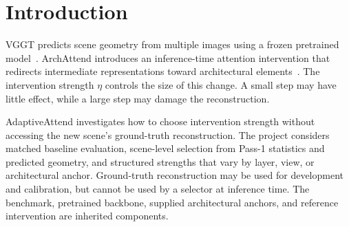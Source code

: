 \section{Introduction}
\label{sec:introduction}
VGGT predicts scene geometry from multiple images using a frozen pretrained model~\cite{vggt}. ArchAttend introduces an inference-time attention intervention that redirects intermediate representations toward architectural elements~\cite{archworld}. The intervention strength $\eta$ controls the size of this change. A small step may have little effect, while a large step may damage the reconstruction.

AdaptiveAttend investigates how to choose intervention strength without accessing the new scene's ground-truth reconstruction. The project considers matched baseline evaluation, scene-level selection from Pass-1 statistics and predicted geometry, and structured strengths that vary by layer, view, or architectural anchor. Ground-truth reconstruction may be used for development and calibration, but cannot be used by a selector at inference time. The benchmark, pretrained backbone, supplied architectural anchors, and reference intervention are inherited components.
